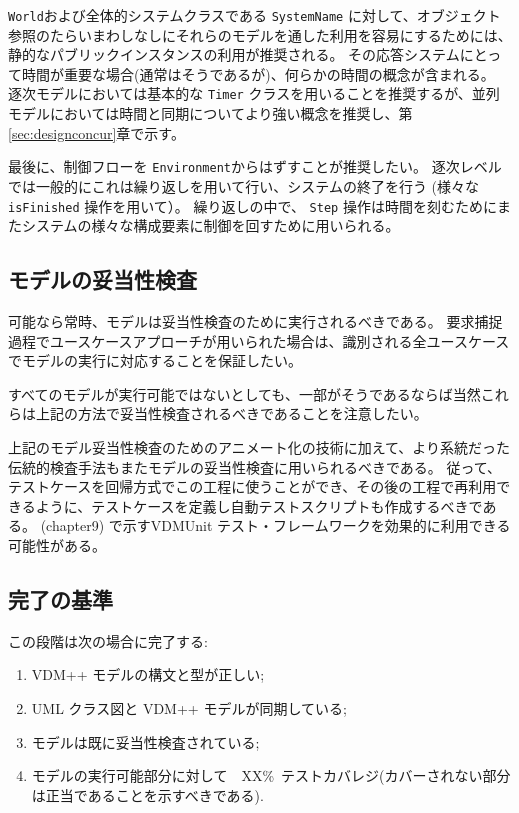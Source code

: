 \documentclass[\pformat,12pt]{jreport}
\begin{document}
 \texttt{World}および全体的システムクラスである \texttt{SystemName} に対して、オブジェクト参照のたらいまわしなしにそれらのモデルを通した利用を容易にするためには、静的なパブリックインスタンスの利用が推奨される。
その応答システムにとって時間が重要な場合(通常はそうであるが)、何らかの時間の概念が含まれる。
逐次モデルにおいては基本的な \texttt{Timer} クラスを用いることを推奨するが、並列モデルにおいては時間と同期についてより強い概念を推奨し、第\ref{sec:designconcur}章で示す。

最後に、制御フローを \texttt{Environment}からはずすことが推奨したい。
逐次レベルでは一般的にこれは繰り返しを用いて行い、システムの終了を行う (様々な \texttt{isFinished} 操作を用いて）。
繰り返しの中で、 \texttt{Step} 操作は時間を刻むためにまたシステムの様々な構成要素に制御を回すために用いられる。

\subsection{モデルの妥当性検査}

可能なら常時、モデルは妥当性検査のために実行されるべきである。
要求捕捉過程でユースケースアプローチが用いられた場合は、識別される全ユースケースでモデルの実行に対応することを保証したい。

すべてのモデルが実行可能ではないとしても、一部がそうであるならば当然これらは上記の方法で妥当性検査されるべきであることを注意したい。

上記のモデル妥当性検査のためのアニメート化の技術に加えて、より系統だった伝統的検査手法もまたモデルの妥当性検査に用いられるべきである。
従って、テストケースを回帰方式でこの工程に使うことができ、その後の工程で再利用できるように、テストケースを定義し自動テストスクリプトも作成するべきである。
\cite{Fitzgerald&05} (chapter9) で示すVDMUnit テスト・フレームワークを効果的に利用できる可能性がある。

\subsection{完了の基準}

この段階は次の場合に完了する:

\begin{enumerate}
\item  VDM++ モデルの構文と型が正しい;
\item  UML クラス図と VDM++ モデルが同期している;
\item  モデルは既に妥当性検査されている;
\item モデルの実行可能部分に対して　XX\%\ テストカバレジ(カバーされない部分は正当であることを示すべきである).
\end{enumerate}
\end{document}
